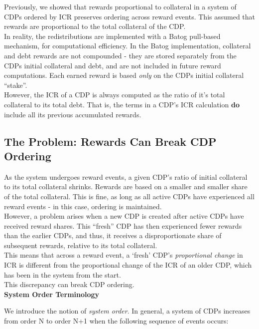 \documentclass[reqno]{article}
\begin{document}
Previously, we showed that rewards proportional to collateral in a system of CDPs ordered by ICR preserves ordering across reward events. This assumed that rewards are proportional to the total collateral of the CDP.\\

In reality, the redistributions are implemented with a Batog pull-based mechanism, for computational efficiency.  In the Batog implementation, collateral and debt rewards are not compounded - they are stored separately from the CDPs initial collateral and debt, and are not included in future reward computations.  Each earned reward is based \textit{only} on the CDPs initial collateral “stake”.\\

However, the ICR of a CDP is always computed as the ratio of it’s total collateral to its total debt. That is, the terms in a CDP’s ICR calculation \textbf{do} include all its previous accumulated rewards.

\bigskip
\subsection*{\textbf{The Problem: Rewards Can Break CDP Ordering}}

As the system undergoes reward events, a given CDP’s ratio of initial collateral to its total collateral shrinks. Rewards are based on a smaller and smaller share of the total collateral. This is fine, as long as all active CDPs have experienced all reward events - in this case, ordering is maintained.\\

However, a problem arises when a new CDP is created after active CDPs have received reward shares.  This “fresh” CDP has then experienced fewer rewards than the earlier CDPs, and thus, it receives a disproportionate share of subsequent rewards, relative to its total collateral.\\

This means that across a reward event, a ‘fresh’ CDP’s \textit{proportional change} in ICR is different from the proportional change of the ICR of an older CDP, which has been in the system from the start.\\

This discrepancy can break CDP ordering.\\

\bigskip
\textbf{System Order Terminology}

We introduce the notion of \textit{system order}. In general, a system of CDPs increases from order N to order N+1 when the following sequence of events occurs:
\end{document}
